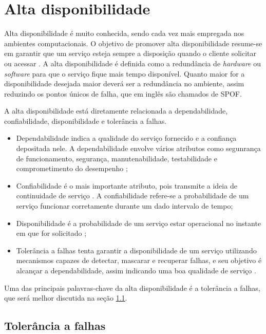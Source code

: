 \chapter{Alta disponibilidade}
\label{cap:altadiponibilidade}

Alta disponibilidade é muito conhecida, sendo cada vez mais empregada nos ambientes computacionais. O objetivo de promover alta disponibilidade 
resume-se em garantir que um serviço esteja sempre a disposição quando o cliente solicitar ou acessar \cite{costa2009}.
A alta disponibilidade é definida como a redundância de \textit{hardware} ou \textit{software} para que o serviço fique mais tempo disponível.
Quanto maior for a disponibilidade desejada maior deverá ser a redundância no ambiente, assim reduzindo os pontos únicos de falha,
que em inglês são chamados de \ac{SPOF}.

A alta disponibilidade está diretamente relacionada a dependabilidade, confiabilidade, disponibilidade e tolerância a falhas. 
\begin{itemize}
 \item Dependabilidade indica a qualidade do serviço fornecido e a confiança depositada nele. A dependabilidade envolve vários
atributos como segunrança de funcionamento, segurança, manutenabilidade, testabilidade e comprometimento do desempenho \cite{weber2002};
 \item Confiabilidade é o mais importante atributo, pois transmite a ideia de continuidade de serviço \cite{pankaj1994}. A confiabilidade refere-se 
a probabilidade de um serviço funcionar corretamente durante um dado intervalo de tempo;
 \item Disponibilidade é a probabilidade de um serviço estar operacional no instante em que for solicitado \cite{costa2009};
  \item Tolerância a falhas tenta garantir a disponibilidade de um serviço utilizando mecanismos capazes de detectar, mascarar e recuperar falhas, 
e seu objetivo é alcançar a dependabilidade, assim indicando uma boa qualidade de serviço \cite{costa2009}.
\end{itemize}

Uma das principais palavras-chave da alta disponibilidade é a tolerância a falhas, que será melhor discutida na seção \ref{section:toleranciafalhas}.

\section{Tolerância a falhas}
\label{section:toleranciafalhas}

